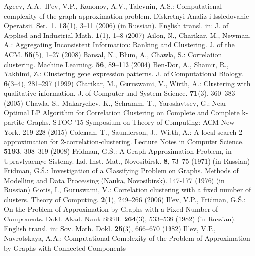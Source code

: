 \documentclass[runningheads]{llncs}
\begin{document}

\begin{thebibliography}{50}

Ageev, A.A., Il'ev, V.P., Kononov, A.V., Talevnin, A.S.:
Computational complexity of the graph approximation problem.
Diskretnyi Analiz i Issledovanie Operatsii. Ser.~1. \textbf{13}(1),
3--11 (2006) (in Russian). English transl. in: J. of Applied and
Industrial Math. \textbf{1}(1), 1--8 (2007)
%
Ailon, N., Charikar, M., Newman, A.: Aggregating Inconsistent Information:
Ranking and Clustering. J. of the ACM. \textbf{55}(5), 1--27 (2008)
%
Bansal, N., Blum, A., Chawla, S.: Correlation clustering. Machine
Learning. \textbf{56}, 89--113 (2004)
%
Ben-Dor, A., Shamir, R., Yakhimi, Z.: Clustering gene expression patterns.
J. of Computational Biology. \textbf{6}(3--4), 281--297 (1999)
%
Charikar, M., Guruswami, V., Wirth, A.: Clustering with
qualitative information. J. of Computer and System Science. 
\textbf{71}(3), 360--383 (2005)
%
Chawla, S., Makarychev, K., Schramm, T., Yaroslavtsev, G.: Near Optimal
LP Algorithm for Correlation Clustering on Complete and Complete k-partite
Graphs. STOC '15 Symposium on Theory of Computing: ACM New York.
219-228 (2015)
%
Coleman, T., Saunderson, J., Wirth, A.:
A local-search 2-approximation for 2-correlation-clustering.
Lecture Notes in Computer Science. \textbf{5193}, 308--319 (2008)
%
Fridman, G.\v{S}.: A Graph Approximation Problem, in Upravlyaemye
Sistemy. Izd. Inst. Mat., Novosibirsk.  \textbf{8}, 73--75 (1971) (in Russian)
%
Fridman, G.\v{S}.: Investigation of a Classifying Problem on Graphs. 
Methods of Modelling and Data Processing (Nauka, Novosibirsk).
147-177 (1976) (in Russian)
%
Giotis, I., Guruswami, V.: Correlation clustering with a
fixed number of clusters. Theory of Computing.
\textbf{2}(1), 249--266 (2006)
%
Il'ev, V.P., Fridman, G.\v{S}.: On the Problem of Approximation
by Graphs with a Fixed Number of Components.
Dokl. Akad. Nauk SSSR. \textbf{264}(3), 533--538 (1982) (in Russian).
English transl. in: Sov. Math. Dokl. \textbf{25}(3), 666--670 (1982)
%
Il'ev, V.P., Navrotskaya, A.A.: Computational Complexity 
of the Problem of Approximation by Graphs with Connected Components

\end{thebibliography}
\end{document}
